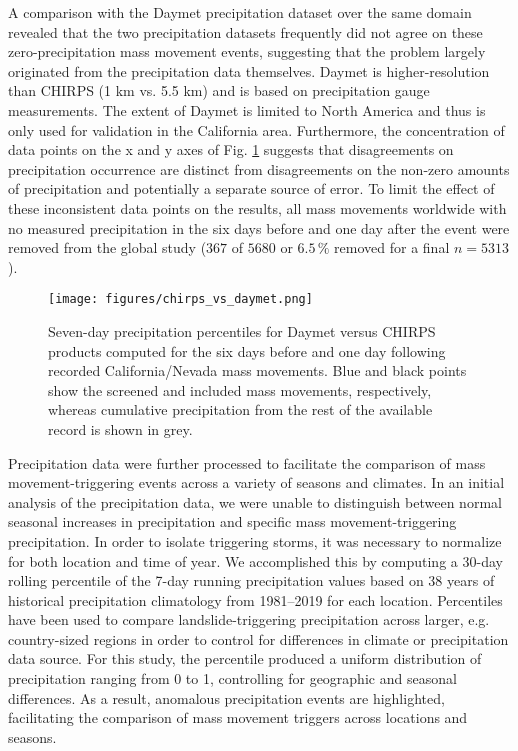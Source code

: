 \documentclass[nhess, manuscript]{copernicus}
\begin{document}
A comparison with the Daymet precipitation dataset over the same 
domain revealed that the two precipitation datasets frequently did not agree on these 
zero-precipitation mass movement events, suggesting that the problem largely originated from 
the precipitation data themselves. Daymet is higher-resolution than CHIRPS (1 km vs. 5.5 km) and is based on precipitation gauge measurements. The extent of Daymet is limited to North America and thus is only used for validation in the California area. Furthermore, the concentration of data points on the 
x and y axes of Fig. \ref{fig:chirps-daymet} suggests that disagreements on precipitation 
occurrence are distinct from disagreements on the non-zero amounts of precipitation and 
potentially a separate source of error. To limit the effect of these inconsistent data 
points on the results, all mass movements worldwide with no measured precipitation in the 
six days before and one day after the event were removed from the global study (\(367\) 
of \(5680\) or \(6.5\,\%\) removed for a final \(n=5313\)). 

\begin{figure}
\centering
\texttt{[image: figures/chirps\_vs\_daymet.png]}
\caption{Seven-day precipitation percentiles for Daymet versus CHIRPS products computed 
for the six days before and one day following recorded California/Nevada mass movements. 
Blue and black points show the screened and included mass movements, respectively, whereas 
cumulative precipitation from the rest of the available record is shown in grey.}
\label{fig:chirps-daymet}
\end{figure}

Precipitation data were further processed to facilitate the comparison of mass 
movement-triggering events across a variety of seasons and climates. In an initial 
analysis of the precipitation data, we were unable to distinguish between normal 
seasonal increases in precipitation and specific mass movement-triggering precipitation. 
In order to isolate triggering storms, it was necessary to normalize for both 
location and time of year. We accomplished this by computing a 30-day rolling 
percentile of the 7-day running precipitation values based on 38 years of historical precipitation climatology from 1981–2019 for each location. Percentiles have been used to compare landslide-triggering precipitation across larger, e.g. country-sized regions \citep{kirschbaumChangesExtremePrecipitation2020, araujo2022impact} in order to control for differences in climate or precipitation data source. For this study, the percentile produced a uniform distribution of precipitation ranging from 0 to 1, controlling for geographic and seasonal differences. As a result, anomalous precipitation events are highlighted, facilitating the comparison of mass movement triggers across locations and seasons.
\end{document}
